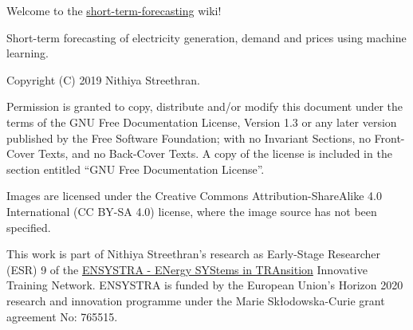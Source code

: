 Welcome to the
\href{https://github.com/ENSYSTRA/short-term-forecasting}{short-term-forecasting}
wiki!

Short-term forecasting of electricity generation, demand and prices
using machine learning.

Copyright (C) 2019 Nithiya Streethran.

Permission is granted to copy, distribute and/or modify this document
under the terms of the GNU Free Documentation License, Version 1.3 or
any later version published by the Free Software Foundation; with no
Invariant Sections, no Front-Cover Texts, and no Back-Cover Texts. A
copy of the license is included in the section entitled ``GNU Free
Documentation License''.

Images are licensed under the Creative Commons Attribution-ShareAlike
4.0 International (CC BY-SA 4.0) license, where the image source has not
been specified.

This work is part of Nithiya Streethran's research as Early-Stage
Researcher (ESR) 9 of the \href{https://ensystra.eu/}{ENSYSTRA - ENergy
SYStems in TRAnsition} Innovative Training Network. ENSYSTRA is funded
by the European Union's Horizon 2020 research and innovation programme
under the Marie Skłodowska-Curie grant agreement No: 765515.
